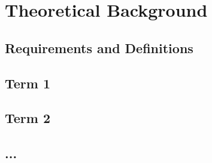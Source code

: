 \chapter{Theoretical Background}

\section{Requirements and Definitions}

\section{Term 1}

\section{Term 2}

\section{...}
